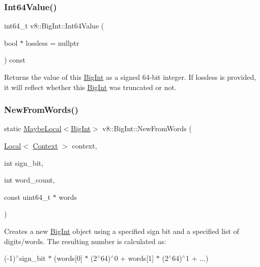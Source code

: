 \subsubsection{\texorpdfstring{Int64\+Value()}{Int64Value()}}
{\footnotesize\ttfamily int64\+\_\+t v8\+::\+Big\+Int\+::\+Int64\+Value (\begin{DoxyParamCaption}\item[{bool $\ast$}]{lossless = {\ttfamily nullptr} }\end{DoxyParamCaption}) const}

Returns the value of this \mbox{\hyperlink{classv8_1_1BigInt}{Big\+Int}} as a signed 64-\/bit integer. If {\ttfamily lossless} is provided, it will reflect whether this \mbox{\hyperlink{classv8_1_1BigInt}{Big\+Int}} was truncated or not. \mbox{\label{classv8_1_1BigInt_a2e315509efbc08fef90ef54d7e179e4d}} 
\subsubsection{\texorpdfstring{New\+From\+Words()}{NewFromWords()}}
{\footnotesize\ttfamily static \mbox{\hyperlink{classv8_1_1MaybeLocal}{Maybe\+Local}}$<$\mbox{\hyperlink{classv8_1_1BigInt}{Big\+Int}}$>$ v8\+::\+Big\+Int\+::\+New\+From\+Words (\begin{DoxyParamCaption}\item[{\mbox{\hyperlink{classv8_1_1Local}{Local}}$<$ \mbox{\hyperlink{classv8_1_1Context}{Context}} $>$}]{context,  }\item[{int}]{sign\+\_\+bit,  }\item[{int}]{word\+\_\+count,  }\item[{const uint64\+\_\+t $\ast$}]{words }\end{DoxyParamCaption})\hspace{0.3cm}{\ttfamily [static]}}

Creates a new \mbox{\hyperlink{classv8_1_1BigInt}{Big\+Int}} object using a specified sign bit and a specified list of digits/words. The resulting number is calculated as\+:

(-\/1)$^\wedge$sign\+\_\+bit $\ast$ (words\mbox{[}0\mbox{]} $\ast$ (2$^\wedge$64)$^\wedge$0 + words\mbox{[}1\mbox{]} $\ast$ (2$^\wedge$64)$^\wedge$1 + ...) \mbox{\label{classv8_1_1BigInt_adbc582fd6ae26b6afe9b5591b5fe06e7}} 

